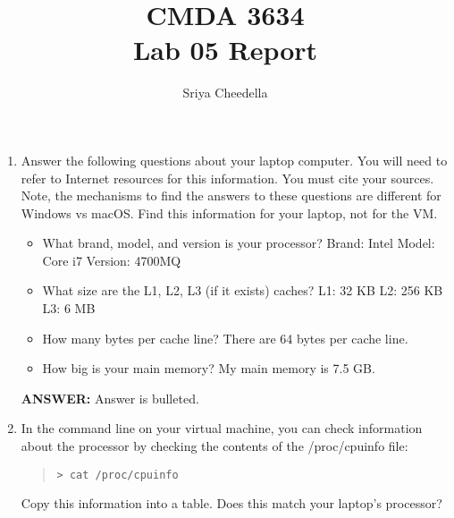 \documentclass[letter]{article}
\title{CMDA 3634 \\ Lab 05 Report}
\author{Sriya Cheedella}
\newcommand{\cmd}[1]{\begin{quote}\texttt{> #1}\end{quote}}
\begin{document}
\maketitle

    \begin{enumerate}
        \item Answer the following questions about your laptop computer.  You will need to refer to Internet resources for this information.  You must cite your sources.  Note, the mechanisms to find the answers to these questions are different for Windows vs macOS.  Find this information for your laptop, not for the VM.
            \begin{itemize}
                \item What brand, model, and version is your processor? \newline
                Brand: Intel \newline
                Model: Core i7 \newline
                Version: 4700MQ
                \item What size are the L1, L2, L3 (if it exists) caches? \newline
                L1: 32 KB \newline
                L2: 256 KB \newline
                L3: 6 MB \newline
                \item How many bytes per cache line? \newline
                There are 64 bytes per cache line.
                \item How big is your main memory? \newline
                My main memory is 7.5 GB.
            \end{itemize}
        
        \textbf{ANSWER:} Answer is bulleted.


        \item In the command line on your virtual machine, you can check information about the processor by checking the contents of the /proc/cpuinfo file: \cmd{cat /proc/cpuinfo}
        Copy this information into a table. Does this match your laptop's 
        processor? 
        

\end{enumerate}
\end{document}
